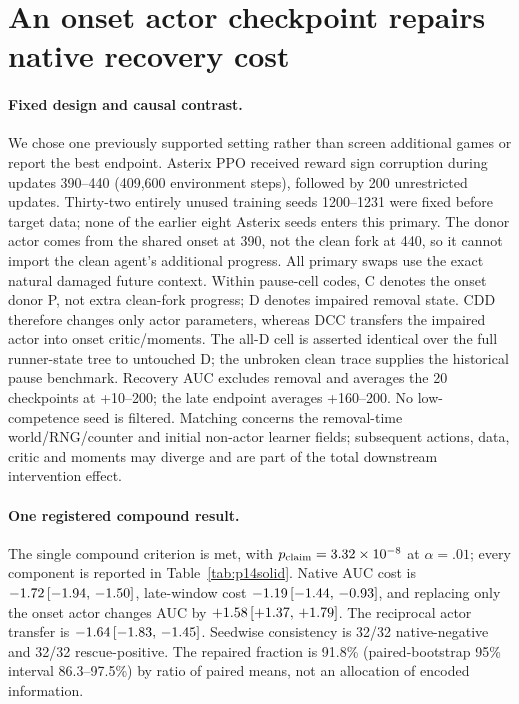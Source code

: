 \section{An onset actor checkpoint repairs native recovery cost}\label{sec:p14solid}
\paragraph{Fixed design and causal contrast.} We chose one previously supported setting rather than screen additional games or report the best endpoint. Asterix PPO received reward sign corruption during updates 390--440 (409{,}600 environment steps), followed by 200 unrestricted updates. Thirty-two entirely unused training seeds 1200--1231 were fixed before target data; none of the earlier eight Asterix seeds enters this primary. The donor actor comes from the shared onset at 390, not the clean fork at 440, so it cannot import the clean agent's additional progress. All primary swaps use the exact natural damaged future context. Within pause-cell codes, C denotes the onset donor P, not extra clean-fork progress; D denotes impaired removal state. CDD therefore changes only actor parameters, whereas DCC transfers the impaired actor into onset critic/moments. The all-D cell is asserted identical over the full runner-state tree to untouched D; the unbroken clean trace supplies the historical pause benchmark. Recovery AUC excludes removal and averages the 20 checkpoints at +10--200; the late endpoint averages +160--200. No low-competence seed is filtered. Matching concerns the removal-time world/RNG/counter and initial non-actor learner fields; subsequent actions, data, critic and moments may diverge and are part of the total downstream intervention effect.

\paragraph{One registered compound result.} The single compound criterion is met, with $p_{\rm claim}=3.32\times10^{-8}$ at $\alpha=.01$; every component is reported in Table~\ref{tab:p14solid}. Native AUC cost is $-1.72\,[-1.94,\,-1.50]$, late-window cost $-1.19\,[-1.44,\,-0.93]$, and replacing only the onset actor changes AUC by $+1.58\,[+1.37,\,+1.79]$. The reciprocal actor transfer is $-1.64\,[-1.83,\,-1.45]$. Seedwise consistency is 32/32 native-negative and 32/32 rescue-positive. The repaired fraction is 91.8\% (paired-bootstrap 95\% interval 86.3--97.5\%) by ratio of paired means, not an allocation of encoded information.

